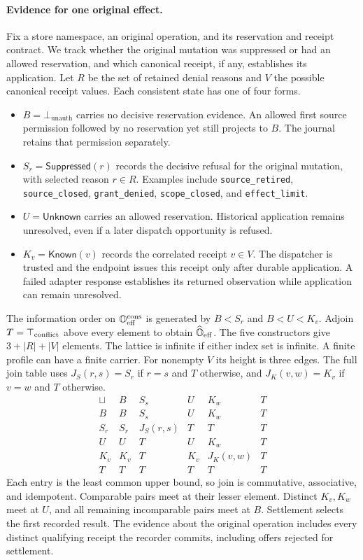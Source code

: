 \documentclass[11pt,a4paper]{article}
\theoremstyle{definition}
\theoremstyle{remark}
\begin{document}
\paragraph{Evidence for one original effect.}
\label{par:effect-evidence}
Fix a store namespace, an original operation, and its reservation and receipt contract. We track whether the original mutation was suppressed or had an allowed reservation, and which canonical receipt, if any, establishes its application. Let $R$ be the set of retained denial reasons and $V$ the possible canonical receipt values. Each consistent state has one of four forms.
\begin{itemize}
\item $B=\bot_{\text{unauth}}$ carries no decisive reservation evidence. An allowed first source permission followed by no reservation yet still projects to $B$. The journal retains that permission separately.
\item $S_r=\mathsf{Suppressed}(r)$ records the decisive refusal for the original mutation, with selected reason $r\in R$. Examples include \texttt{source\_retired}, \texttt{source\_closed}, \texttt{grant\_denied}, \texttt{scope\_closed}, and \texttt{effect\_limit}.
\item $U=\mathsf{Unknown}$ carries an allowed reservation. Historical application remains unresolved, even if a later dispatch opportunity is refused.
\item $K_v=\mathsf{Known}(v)$ records the correlated receipt $v\in V$. The dispatcher is trusted and the endpoint issues this receipt only after durable application. A failed adapter response establishes its returned observation while application can remain unresolved.
\end{itemize}

The information order on $\mathbb O_{\rm eff}^{\rm cons}$ is generated by $B<S_r$ and $B<U<K_v$. Adjoin $T=\top_{\rm conflict}$ above every element to obtain $\widehat{\mathbb O}_{\rm eff}$. The five constructors give $3+\lvert R\rvert+\lvert V\rvert$ elements. The lattice is infinite if either index set is infinite. A finite profile can have a finite carrier. For nonempty $V$ its height is three edges. The full join table uses $J_S(r,s)=S_r$ if $r=s$ and $T$ otherwise, and $J_K(v,w)=K_v$ if $v=w$ and $T$ otherwise.
\[
\begin{array}{c|ccccc}
\sqcup & B & S_s & U & K_w & T\\ \hline
B   & B   & S_s      & U   & K_w      & T\\
S_r & S_r & J_S(r,s) & T   & T        & T\\
U   & U   & T        & U   & K_w      & T\\
K_v & K_v & T        & K_v & J_K(v,w) & T\\
T   & T   & T        & T   & T        & T
\end{array}
\]
Each entry is the least common upper bound, so join is commutative, associative, and idempotent. Comparable pairs meet at their lesser element. Distinct $K_v,K_w$ meet at $U$, and all remaining incomparable pairs meet at $B$. Settlement selects the first recorded result. The evidence about the original operation includes every distinct qualifying receipt the recorder commits, including offers rejected for settlement.
\end{document}
